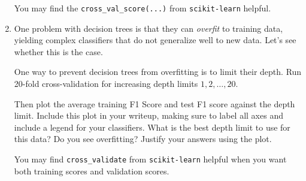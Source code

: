 \begin{enumerate}
You may find the \verb|cross_val_score(...)| from \verb|scikit-learn| helpful. 



\item {} One problem with decision trees is that they can \emph{overfit} to training data, yielding complex classifiers that do not generalize well to new data. Let's see whether this is the case.

One way to prevent decision trees from overfitting is to limit their depth. Run 20-fold cross-validation for increasing depth limits $1,2,\ldots,20$. 

Then plot the average training F1 Score and test F1 score against the depth limit. Include this plot in your writeup, making sure to label all axes and include a legend for your classifiers. What is the best depth limit to use for this data? Do you see overfitting? Justify your answers using the plot.

You may find \verb|cross_validate| from \verb|scikit-learn| helpful when you want both training scores and validation scores.


\end{enumerate}

